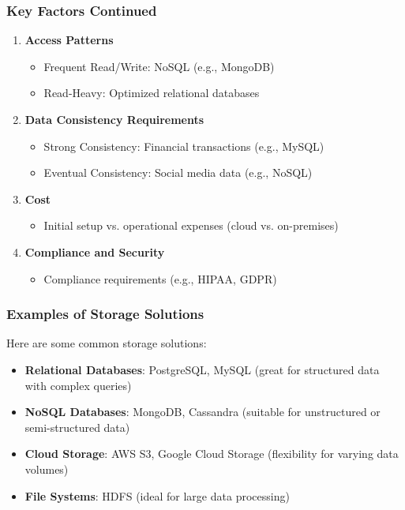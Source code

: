 \documentclass[aspectratio=169]{beamer}
\begin{document}
\begin{frame}[fragile]
    \frametitle{Key Factors Continued}
    \begin{enumerate}[start=4]
        \item \textbf{Access Patterns}
            \begin{itemize}
                \item Frequent Read/Write: NoSQL (e.g., MongoDB)
                \item Read-Heavy: Optimized relational databases
            \end{itemize}

        \item \textbf{Data Consistency Requirements}
            \begin{itemize}
                \item Strong Consistency: Financial transactions (e.g., MySQL)
                \item Eventual Consistency: Social media data (e.g., NoSQL)
            \end{itemize}

        \item \textbf{Cost}
            \begin{itemize}
                \item Initial setup vs. operational expenses (cloud vs. on-premises)
            \end{itemize}

        \item \textbf{Compliance and Security}
            \begin{itemize}
                \item Compliance requirements (e.g., HIPAA, GDPR)
            \end{itemize}
    \end{enumerate}
\end{frame}

\begin{frame}[fragile]
    \frametitle{Examples of Storage Solutions}
    Here are some common storage solutions:

    \begin{itemize}
        \item \textbf{Relational Databases}: PostgreSQL, MySQL (great for structured data with complex queries)
        \item \textbf{NoSQL Databases}: MongoDB, Cassandra (suitable for unstructured or semi-structured data)
        \item \textbf{Cloud Storage}: AWS S3, Google Cloud Storage (flexibility for varying data volumes)
        \item \textbf{File Systems}: HDFS (ideal for large data processing)
    \end{itemize}
\end{frame}
\end{document}
